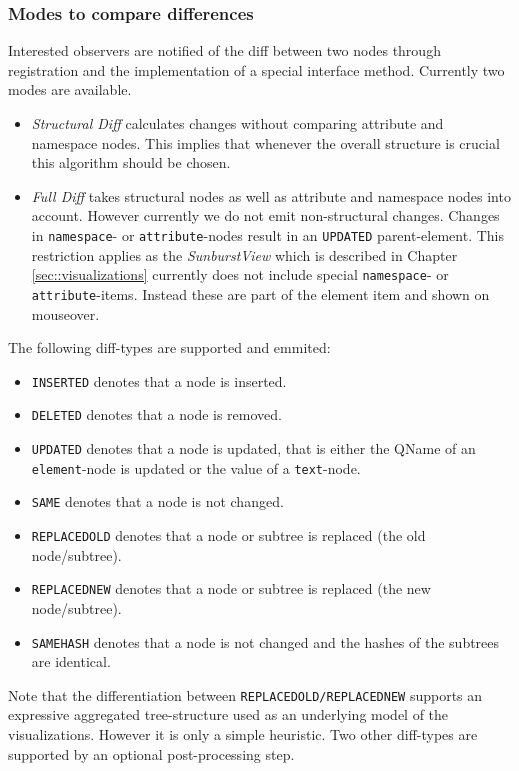 \subsubsection{Modes to compare differences} Interested observers are notified of the diff between two nodes through registration and the implementation of a special interface method. Currently two modes are available.

\begin{itemize}
\item \emph{Structural Diff} calculates changes without comparing attribute and namespace nodes. This implies that whenever the overall structure is crucial this algorithm should be chosen.
\item \emph{Full Diff} takes structural nodes as well as attribute and namespace nodes into account. However currently we do not emit non-structural changes. Changes in \texttt{namespace}- or \texttt{attribute}-nodes result in an \texttt{UPDATED} parent-element. This restriction applies as the \emph{SunburstView} which is described in Chapter \ref{sec::visualizations} currently does not include special \texttt{namespace}- or \texttt{attribute}-items. Instead these are part of the element item and shown on mouseover.
\end{itemize}

The following diff-types are supported and emmited:

\begin{itemize}
\item \texttt{INSERTED} denotes that a node is inserted.
\item \texttt{DELETED} denotes that a node is removed.
\item \texttt{UPDATED} denotes that a node is updated, that is either the QName of an \texttt{element}-node is updated or the value of a \texttt{text}-node.
\item \texttt{SAME} denotes that a node is not changed.
\item \texttt{REPLACEDOLD} denotes that a node or subtree is replaced (the old node/subtree).
\item \texttt{REPLACEDNEW} denotes that a node or subtree is replaced (the new node/subtree).
\item \texttt{SAMEHASH} denotes that a node is not changed and the hashes of the subtrees are identical.
\end{itemize}

Note that the differentiation between \texttt{REPLACEDOLD/REPLACEDNEW} supports an expressive aggregated tree-structure used as an underlying model of the visualizations. However it is only a simple heuristic. Two other diff-types are supported by an optional post-processing step.

